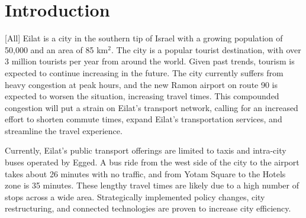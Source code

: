\documentclass[12pt]{article}                               %
\newcommand{\textapprox}{\raisebox{0.1ex}{\texttildelow}}   %
\begin{document}
\begin{abstract}
    Eilat is a city in southern Israel with a population of \textapprox50,000, but over 3 million tourists per year. The city suffers from severe congestion during commuting hours, with traffic jams along major city roads and backed up lines of cars waiting to enter the city by the highway in the north. This project aimed to aid Eilat city planners in its goal to improve its transportation service offerings while minimzing environmental impact, and investigate smart city technologies to reduce congestion. Extensive research on smart cities was conducted, including case studies of other cities, listings of smart city tools, and their applications to Eilat. To further aid city planners in visualizing data, an extensible interactive website was created that displays mapping information and data on flights entering the region. Suggestions for services and citywide goals were developed to guide Eilat towards reducing congestion and becoming a smart city.
\end{abstract}
\newpage

\tableofcontents\newpage
\listofauthorships
\listoffigures
\newpage

\pagestyle{fancy}
\onehalfspacing

\section{Introduction}[All]\label{sec:intro}
Eilat is a city in the southern tip of Israel with a growing population of \textapprox50,000 and an area of 85 km$^2$. The city is a popular tourist destination, with over 3 million tourists per year from around the world. Given past trends, tourism is expected to continue increasing in the future. The city currently suffers from heavy congestion at peak hours, and the new Ramon airport on route 90 is expected to worsen the situation, increasing travel times. This compounded congestion will put a strain on Eilat's transport network, calling for an increased effort to shorten commute times, expand Eilat's transportation services, and streamline the travel experience. 

Currently, Eilat's public transport offerings are limited to taxis and intra-city buses operated by Egged. A bus ride from the west side of the city to the airport takes about 26 minutes with no traffic, and from Yotam Square to the Hotels zone is 35 minutes. These lengthy travel times are likely due to a high number of stops across a wide area. Strategically implemented policy changes, city restructuring, and connected technologies are proven to increase city efficiency.
\end{document}
